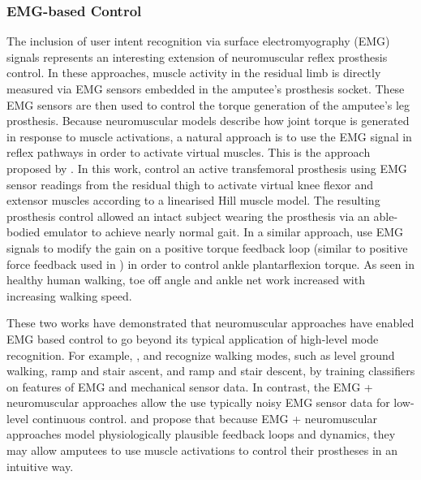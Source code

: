 \subsubsection{EMG-based Control}\label{sec:back_emg_control}
The inclusion of user intent recognition via surface electromyography (EMG)
signals represents an interesting extension of neuromuscular reflex prosthesis
control. In these approaches, muscle activity in the residual limb is directly
measured via EMG sensors embedded in the amputee's prosthesis socket. These EMG
sensors are then used to control the torque generation of the amputee's leg
prosthesis. Because neuromuscular models describe how joint torque is generated
in response to muscle activations, a natural approach is to use the EMG signal
in reflex pathways in order to activate virtual muscles. This is the approach
proposed by \citet{wu2011electromyography}. In this work,
\citeauthor{wu2011electromyography} control an active transfemoral prosthesis
using EMG sensor readings from the residual thigh to activate virtual knee
flexor and extensor muscles according to a linearised Hill muscle model. The
resulting prosthesis control allowed an intact subject wearing the prosthesis
via an able-bodied emulator to achieve nearly normal gait. In a similar
approach, \citet{wang2013proportional} use EMG signals to modify the gain on a
positive torque feedback loop (similar to positive force feedback used in
\citet{geyer2010muscle}) in order to control ankle plantarflexion torque. As
seen in healthy human walking, toe off angle and ankle net work increased with
increasing walking speed.

These two works have demonstrated that neuromuscular approaches have enabled EMG
based control to go beyond its typical application of high-level mode
recognition. For example, \citet{huang2009strategy, huang2011continuous}, and
\citet{hargrove2015intuitive} recognize walking modes, such as level ground
walking, ramp and stair ascent, and ramp and stair descent, by training
classifiers on features of EMG and mechanical sensor data. In contrast, the EMG
+ neuromuscular approaches allow the use typically noisy EMG sensor data for
low-level continuous control. \citet{wu2011electromyography} and
\citet{wang2013proportional} propose that because EMG + neuromuscular approaches
model physiologically plausible feedback loops and dynamics, they may allow
amputees to use muscle activations to control their prostheses in an intuitive
way.

